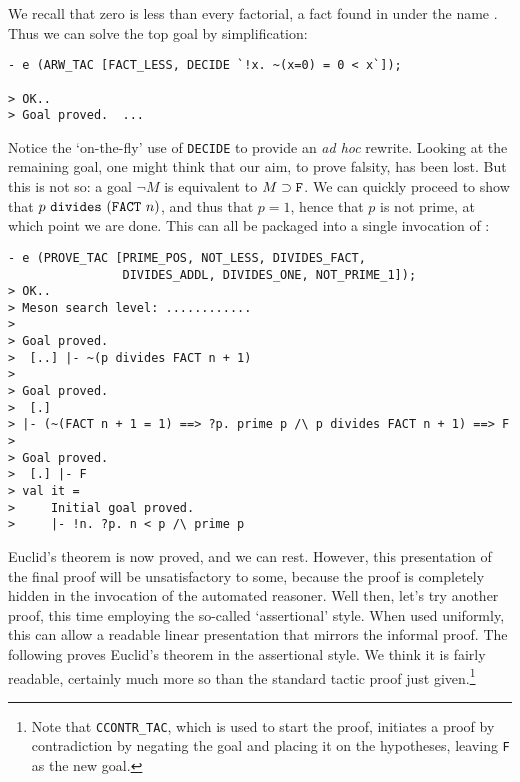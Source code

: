     We recall that zero is less than every factorial, a fact found in
     under the name . Thus we can
    solve the top goal by simplification:
\begin{session}\begin{verbatim}
- e (ARW_TAC [FACT_LESS, DECIDE `!x. ~(x=0) = 0 < x`]);

> OK..
> Goal proved.  ...
\end{verbatim}\end{session}
Notice the `on-the-fly' use of \verb+DECIDE+ to provide an {\it ad hoc\/}
rewrite. Looking at the remaining goal, one might think that our aim, to
prove falsity, has been lost. But this is not so: a goal $\neg
M$ is equivalent to $M \supset \mbox{\tt F}$. We can quickly proceed to
show that $p \ \mbox{\tt divides}\ (\mbox{\tt FACT}\ n)$, and thus that
$p = 1$, hence that $p$ is not prime, at which point we are done. This
can all be packaged into a single invocation of :
\begin{session}\begin{verbatim}
- e (PROVE_TAC [PRIME_POS, NOT_LESS, DIVIDES_FACT,
                DIVIDES_ADDL, DIVIDES_ONE, NOT_PRIME_1]);
> OK..
> Meson search level: ............
>
> Goal proved.
>  [..] |- ~(p divides FACT n + 1)
>
> Goal proved.
>  [.]
> |- (~(FACT n + 1 = 1) ==> ?p. prime p /\ p divides FACT n + 1) ==> F
>
> Goal proved.
>  [.] |- F
> val it =
>     Initial goal proved.
>     |- !n. ?p. n < p /\ prime p
\end{verbatim}\end{session}
    Euclid's theorem is now proved, and we can rest. However, this
    presentation of the final proof will be unsatisfactory to some,
    because the proof is completely hidden in the invocation of the
    automated reasoner. Well then, let's try another proof, this time
    employing the so-called `assertional' style. When used uniformly,
    this can allow a readable linear presentation that mirrors the
    informal proof. The following proves Euclid's theorem in the
    assertional style. We think it is fairly readable, certainly much
    more so than the standard tactic proof just given.\footnote{Note
      that {\tt CCONTR\_TAC}, which is used to start the proof,
      initiates a proof by contradiction by negating the goal and
      placing it on the hypotheses, leaving {\tt F} as the new goal.}


